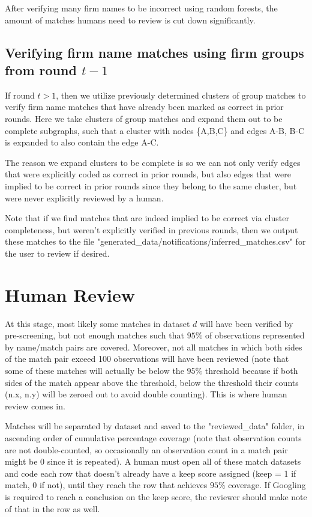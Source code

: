 \documentclass{article}
\begin{document}
After verifying many firm names to be incorrect using random forests, the amount of matches humans need to review is cut down significantly. 

\subsection{Verifying firm name matches using firm groups from round $t - 1$}

If round $t > 1$, then we utilize previously determined clusters of group matches to verify firm name matches that have already been marked as correct in prior rounds. Here we take clusters of group matches and expand them out to be complete subgraphs, such that a cluster with nodes \{A,B,C\} and edges A-B, B-C is expanded to also contain the edge A-C. 

The reason we expand clusters to be complete is so we can not only verify edges that were explicitly coded as correct in prior rounds, but also edges that were implied to be correct in prior rounds since they belong to the same cluster, but were never explicitly reviewed by a human. 

Note that if we find matches that are indeed implied to be correct via cluster completeness, but weren't explicitly verified in previous rounds, then we output these matches to the file "generated\_data/notifications/inferred\_matches.csv" for the user to review if desired. 

\section{Human Review}

At this stage, most likely some matches in dataset $d$ will have been verified by pre-screening, but not enough matches such that $95\%$ of observations represented by name/match pairs are covered. Moreover, not all matches in which both sides of the match pair exceed 100 observations will have been reviewed (note that some of these matches will actually be below the $95\%$ threshold because if both sides of the match appear above the threshold, below the threshold their counts (n.x, n.y) will be zeroed out to avoid double counting). This is where human review comes in. 

Matches will be separated by dataset and saved to the "reviewed\_data" folder, in ascending order of cumulative percentage coverage (note that observation counts are not double-counted, so occasionally an observation count in a match pair might be 0 since it is repeated). A human must open all of these match datasets and code each row that doesn't already have a keep score assigned (keep = 1 if match, 0 if not), until they reach the row that achieves $95\%$ coverage. If Googling is required to reach a conclusion on the keep score, the reviewer should make note of that in the row as well. 
\end{document}

